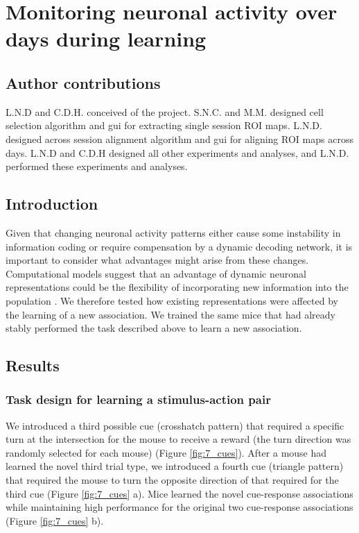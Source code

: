 \chapter{Monitoring neuronal activity over days during learning} \label{chapter_4}

\section{Author contributions}
L.N.D and C.D.H. conceived of the project. S.N.C. and M.M. designed cell selection algorithm and gui for extracting single session ROI maps. L.N.D. designed across session alignment algorithm and gui for aligning ROI maps across days. L.N.D and C.D.H designed all other experiments and analyses, and L.N.D. performed these experiments and analyses. 

\section{Introduction}\label{sec:chap4_intro}

Given that changing neuronal activity patterns either cause some instability in information coding or require compensation by a dynamic decoding network, it is important to consider what advantages might arise from these changes. Computational models suggest that an advantage of dynamic neuronal representations could be the flexibility of incorporating new information into the population \citep{Ajemian2013, Rokni2007a}. We therefore tested how existing representations were affected by the learning of a new association. We trained the same mice that had already stably performed the task described above to learn a new association.

\section{Results} \label{sec:chap4_results}

\subsection{Task design for learning a stimulus-action pair} \label{chap4:stim_action}

 We introduced a third possible cue (crosshatch pattern) that required a specific turn at the intersection for the mouse to receive a reward (the turn direction was randomly selected for each mouse) (Figure \ref{fig:7_cues}). After a mouse had learned the novel third trial type, we introduced a fourth cue (triangle pattern) that required the mouse to turn the opposite direction of that required for the third cue (Figure \ref{fig:7_cues} a). Mice learned the novel cue-response associations while maintaining high performance for the original two cue-response associations (Figure \ref{fig:7_cues} b).

